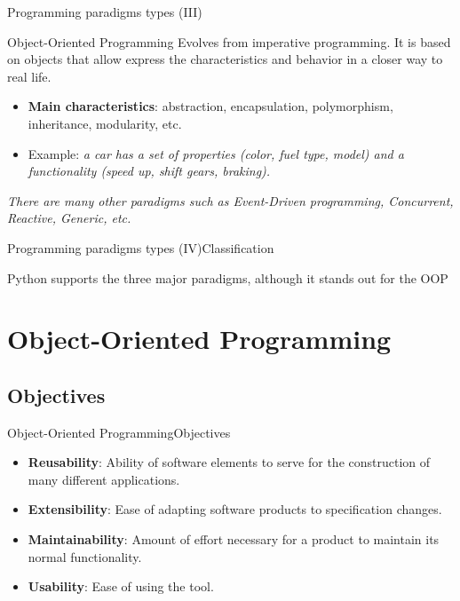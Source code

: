 \documentclass[10pt,compress]{beamer} %
\begin{document}
\begin{frame}{Programming paradigms types (III)}{}
	\begin{block}{Object-Oriented Programming}
		Evolves from imperative programming. It is based on \alert{objects} that allow express the \alert{characteristics} and \alert{behavior} in a closer way to real life. 
  	\end{block}
  	\begin{itemize}
  		\item \textbf{Main characteristics}: abstraction, encapsulation, polymorphism, inheritance, modularity, etc.
		\item Example: \textit{a car has a set of properties (color, fuel type, model) and a functionality (speed up, shift gears, braking).} 
  	\end{itemize}
  	
\textit{\alert{There are many other paradigms such as Event-Driven programming, Concurrent, Reactive, Generic, etc.}}
\end{frame}

\begin{frame}{Programming paradigms types (IV)}{Classification}
    
	
	\centering Python supports the three major paradigms, although it stands out for the OOP
\end{frame}

\section[Object-Oriented Programming]{Object-Oriented Programming}

\subsection{Objectives}

\begin{frame}{Object-Oriented Programming}{Objectives}
\begin{itemize}
  	\item \textbf{Reusability}: Ability of software elements to serve for the construction of many different applications.
  	\item \textbf{Extensibility}: Ease of adapting software products to specification changes.
  	\item \textbf{Maintainability}: Amount of effort necessary for a product to maintain its normal functionality.   
  	\item \textbf{Usability}: Ease of using the tool.
  	\end{itemize} 	
\end{frame}
\end{document}
